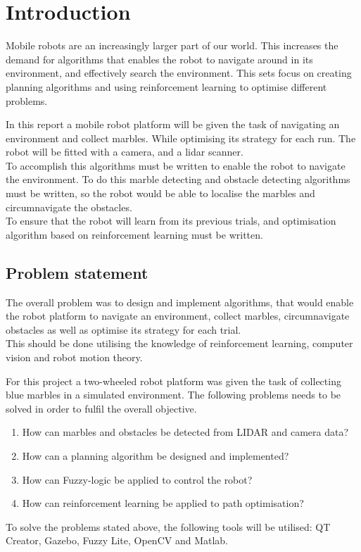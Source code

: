 \documentclass[../Head/Main.tex]{subfiles}
\begin{document}
\section{Introduction}
Mobile robots are an increasingly larger part of our world. This increases the demand for algorithms that enables the robot to navigate around in its environment, and effectively search the environment. This sets focus on creating planning algorithms and using reinforcement learning to optimise different problems.\par 
In this report a mobile robot platform will be given the task of navigating an environment and collect marbles. While optimising its strategy for each run. The robot will be fitted with a camera, and a lidar scanner.\\
To accomplish this algorithms must be written to enable the robot to navigate the environment. To do this marble detecting and obstacle detecting algorithms must be written, so the robot would be able to localise the marbles and circumnavigate the obstacles.\\
To ensure that the robot will learn from its previous trials, and optimisation algorithm based on reinforcement learning must be written.    

\subsection{Problem statement}
The overall problem was to design and implement algorithms, that would enable the robot platform to navigate an environment, collect marbles, circumnavigate obstacles as well as optimise its strategy for each trial.\\
This should be done utilising the knowledge of reinforcement learning, computer vision and robot motion theory.\par
For this project a two-wheeled robot platform was given the task of collecting blue marbles in a simulated environment. The following problems needs to be solved in order to fulfil the overall objective.

\begin{enumerate}
        \item How can marbles and obstacles be detected from LIDAR and camera data?
		\item How can a planning algorithm be designed and implemented?
		\item How can Fuzzy-logic be applied to control the robot?
		\item How can reinforcement learning be applied to path optimisation?
\end{enumerate}
To solve the problems stated above, the following tools will be utilised: QT Creator, Gazebo, Fuzzy Lite, OpenCV and Matlab.
\end{document}
